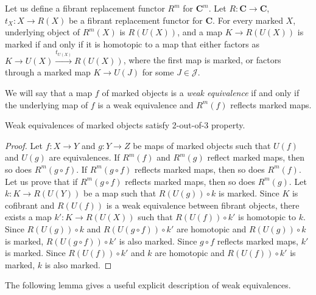\documentclass[reqno]{amsart}
\theoremstyle{definition}
\theoremstyle{remark}
\newcommand{\cat}[1]{\mathbf{#1}}
\newcommand{\C}{\cat{C}}
\numberwithin{figure}{section}
\begin{document}
Let us define a fibrant replacement functor $R^m$ for $\C^m$.
Let $R : \C \to \C$, $t_X : X \to R(X)$ be a fibrant replacement functor for $\C$.
For every marked $X$, underlying object of $R^m(X)$ is $R(U(X))$, and a map $K \to R(U(X))$ is marked if and only if it is homotopic to a map that
either factors as $K \to U(X) \xrightarrow{t_{U(X)}} R(U(X))$, where the first map is marked,
or factors through a marked map $K \to U(J)$ for some $J \in \mathcal{J}$.

We will say that a map $f$ of marked objects is a \emph{weak equivalence}
if and only if the underlying map of $f$ is a weak equivalence and $R^m(f)$ reflects marked maps.

\begin{prop}[2-out-of-3]
Weak equivalences of marked objects satisfy 2-out-of-3 property.
\end{prop}
\begin{proof}
Let $f : X \to Y$ and $g : Y \to Z$ be maps of marked objects such that $U(f)$ and $U(g)$ are equivalences.
If $R^m(f)$ and $R^m(g)$ reflect marked maps, then so does $R^m(g \circ f)$.
If $R^m(g \circ f)$ reflects marked maps, then so does $R^m(f)$.
Let us prove that if $R^m(g \circ f)$ reflects marked maps, then so does $R^m(g)$.
Let $k : K \to R(U(Y))$ be a map such that $R(U(g)) \circ k$ is marked.
Since $K$ is cofibrant and $R(U(f))$ is a weak equivalence between fibrant objects,
there exists a map $k' : K \to R(U(X))$ such that $R(U(f)) \circ k'$ is homotopic to $k$.
Since $R(U(g)) \circ k$ and $R(U(g \circ f)) \circ k'$ are homotopic and $R(U(g)) \circ k$ is marked, $R(U(g \circ f)) \circ k'$ is also marked.
Since $g \circ f$ reflects marked maps, $k'$ is marked.
Since $R(U(f)) \circ k'$ and $k$ are homotopic and $R(U(f)) \circ k'$ is marked, $k$ is also marked.
\end{proof}

The following lemma gives a useful explicit description of weak equivalences.
\end{document}
